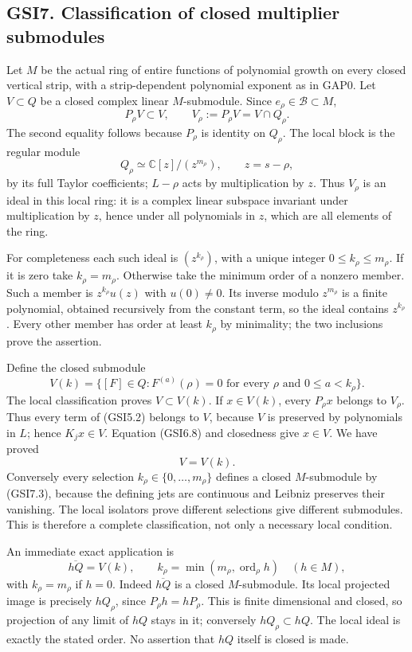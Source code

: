\subsection{GSI7. Classification of closed multiplier
submodules}\label{gsi7.-classification-of-closed-multiplier-submodules}

Let \(M\) be the actual ring of entire functions of polynomial growth on
every closed vertical strip, with a strip-dependent polynomial exponent
as in GAP0. Let \(V\subset Q\) be a closed complex linear
\(M\)-submodule. Since \(e_\rho\in\mathcal B\subset M\), \[
P_\rho V\subset V,\qquad
V_\rho:=P_\rho V=V\cap Q_\rho.
\tag{GSI7.1}
\] The second equality follows because \(P_\rho\) is identity on
\(Q_\rho\). The local block is the regular module \[
Q_\rho\simeq\mathbb C[z]/(z^{m_\rho}),\qquad z=s-\rho,
\tag{GSI7.2}
\] by its full Taylor coefficients; \(L-\rho\) acts by multiplication by
\(z\). Thus \(V_\rho\) is an ideal in this local ring: it is a complex
linear subspace invariant under multiplication by \(z\), hence under all
polynomials in \(z\), which are all elements of the ring.

For completeness each such ideal is \((z^{k_\rho})\), with a unique
integer \(0\le k_\rho\le m_\rho\). If it is zero take \(k_\rho=m_\rho\).
Otherwise take the minimum order of a nonzero member. Such a member is
\(z^{k_\rho}u(z)\) with \(u(0)\ne0\). Its inverse modulo \(z^{m_\rho}\)
is a finite polynomial, obtained recursively from the constant term, so
the ideal contains \(z^{k_\rho}\). Every other member has order at least
\(k_\rho\) by minimality; the two inclusions prove the assertion.

Define the closed submodule \[
V(k)=\{[F]\in Q:F^{(a)}(\rho)=0
\text{ for every }\rho\text{ and }0\le a<k_\rho\}.
\tag{GSI7.3}
\] The local classification proves \(V\subset V(k)\). If \(x\in V(k)\),
every \(P_\rho x\) belongs to \(V_\rho\). Thus every term of (GSI5.2)
belongs to \(V\), because \(V\) is preserved by polynomials in \(L\);
hence \(K_jx\in V\). Equation (GSI6.8) and closedness give \(x\in V\).
We have proved \[
\boxed{V=V(k).}
\tag{GSI7.4}
\] Conversely every selection \(k_\rho\in\{0,\ldots,m_\rho\}\) defines a
closed \(M\)-submodule by (GSI7.3), because the defining jets are
continuous and Leibniz preserves their vanishing. The local isolators
prove different selections give different submodules. This is therefore
a complete classification, not only a necessary local condition.

An immediate exact application is \[
\overline{hQ}=V(k),\qquad
k_\rho=\min(m_\rho,\operatorname{ord}_\rho h)
\quad(h\in M),
\tag{GSI7.5}
\] with \(k_\rho=m_\rho\) if \(h=0\). Indeed \(\overline{hQ}\) is a
closed \(M\)-submodule. Its local projected image is precisely
\(hQ_\rho\), since \(P_\rho h=hP_\rho\). This is finite dimensional and
closed, so projection of any limit of \(hQ\) stays in it; conversely
\(hQ_\rho\subset hQ\). The local ideal is exactly the stated order. No
assertion that \(hQ\) itself is closed is made.

